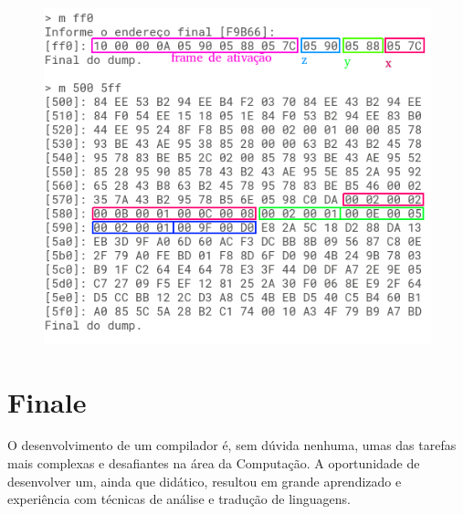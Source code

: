 \documentclass[a4paper,12pt]{report}
\begin{document}
    \begin{figure}[h]
        \centering
        \includegraphics[scale=0.65]{mult}
    \end{figure}

    \chapter*{Finale}
    O desenvolvimento de um compilador é, sem dúvida nenhuma, umas das tarefas mais complexas e desafiantes na área da Computação. A oportunidade de desenvolver um, ainda que didático, resultou em grande aprendizado e experiência com técnicas de análise e tradução de linguagens. 
\end{document}
